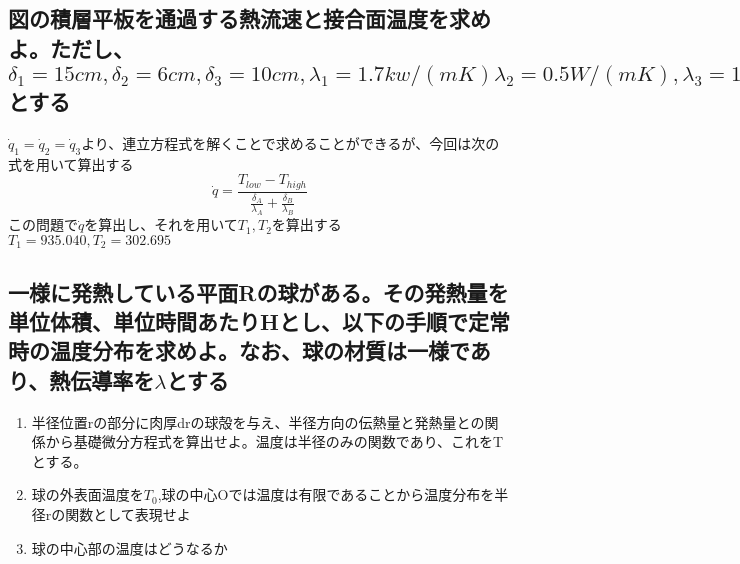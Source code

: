 \documentclass[a4j,twoside,openright,11pt]{jarticle}
\begin{document}
\subsection{図の積層平板を通過する熱流速と接合面温度を求めよ。ただし、$\delta_1 = 15cm,\delta_2 = 6cm, \delta_3 = 10cm, \lambda_1 = 1.7kw/(mK) \lambda_2 =0.5W/(mK), \lambda_3 = 10W/(mK) ,\lambda_1側の温度=1400K \lambda_3側の温度=250K$とする}
$\dot q_1 = \dot q_2 = \dot q_3$より、連立方程式を解くことで求めることができるが、今回は次の式を用いて算出する
\begin{equation}
\dot q = \frac{T_{low} - T_{high} }{ \frac{\delta_A}{\lambda_A} + \frac{\delta_B}{\lambda_B}}
\end{equation}
この問題で$\dot q$を算出し、それを用いて$T_1,T_2$を算出する\\
$T_1 = 935.040 , T_2 = 302.695$

\subsection{一様に発熱している平面Rの球がある。その発熱量を単位体積、単位時間あたりHとし、以下の手順で定常時の温度分布を求めよ。なお、球の材質は一様であり、熱伝導率を$\lambda$とする}
\begin{enumerate}
\item 半径位置rの部分に肉厚drの球殻を与え、半径方向の伝熱量と発熱量との関係から基礎微分方程式を算出せよ。温度は半径のみの関数であり、これをTとする。
\item 球の外表面温度を$T_0$,球の中心Oでは温度は有限であることから温度分布を半径rの関数として表現せよ
\item 球の中心部の温度はどうなるか
\end{enumerate}
\end{document}
